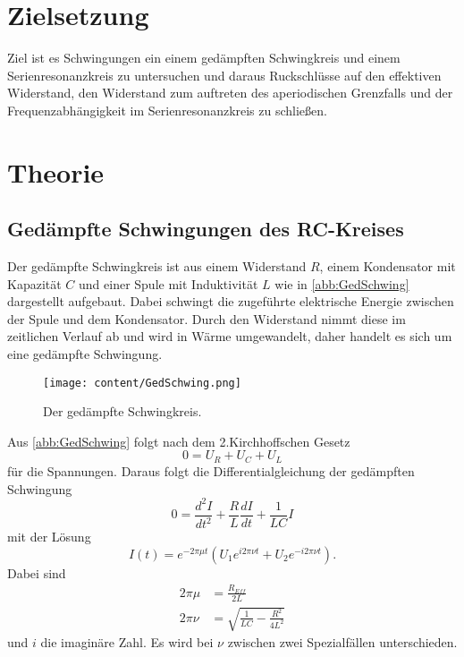 \section{Zielsetzung}
\label{sec:Zielsetzung}
Ziel ist es Schwingungen ein einem gedämpften Schwingkreis und einem Serienresonanzkreis zu untersuchen und daraus
Ruckschlüsse auf den effektiven Widerstand, den Widerstand zum auftreten des aperiodischen Grenzfalls und der Frequenzabhängigkeit
im Serienresonanzkreis zu schließen.
\section{Theorie}
\label{sec:Theorie}
\subsection{Gedämpfte Schwingungen des RC-Kreises}
Der gedämpfte Schwingkreis ist aus einem Widerstand $R$, einem Kondensator mit Kapazität $C$ und
einer Spule mit Induktivität $L$ wie in \autoref{abb:GedSchwing} dargestellt aufgebaut. Dabei schwingt
die zugeführte elektrische Energie zwischen der Spule und dem Kondensator. Durch den Widerstand nimmt diese im zeitlichen
Verlauf ab und wird in Wärme umgewandelt, daher handelt es sich um eine gedämpfte Schwingung.
\begin{figure}[H]
    \centering
    \texttt{[image: content/GedSchwing.png]}
    \caption{Der gedämpfte Schwingkreis. \cite{sample}}
    \label{abb:GedSchwing}
\end{figure}
\noindent Aus \autoref{abb:GedSchwing} folgt nach dem 2.Kirchhoffschen Gesetz
\begin{equation*}
    0 = U_R + U_C + U_L
\end{equation*}
für die Spannungen.
Daraus folgt die Differentialgleichung der gedämpften Schwingung
\begin{equation*}
    0 = \frac{d^2 I}{dt^2} + \frac{R}{L}\frac{dI}{dt} + \frac{1}{LC}I
\end{equation*}
mit der Lösung
\begin{equation}
    \label{eqn:AllgLoes}
    I(t) = e^{-2\pi\mu t}\left(U_1e^{i2\pi\nu t} + U_2e^{-i2\pi\nu t}\right).
\end{equation}
Dabei sind
\begin{align}
   2\pi\mu &= \frac{R_{Eff}}{2L}\\
   2\pi\nu &= \sqrt{\frac{1}{LC} - \frac{R^2}{4L^2}}
\end{align}
und $i$ die imaginäre Zahl.
Es wird bei $\nu$ zwischen zwei Spezialfällen unterschieden.\\
